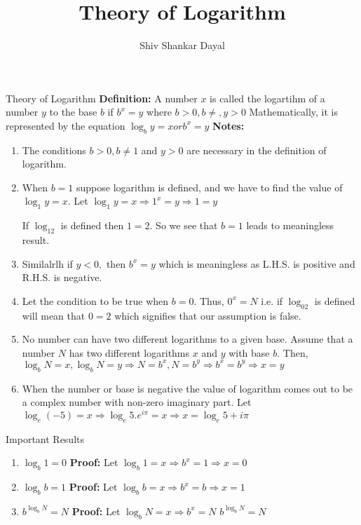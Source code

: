\documentclass[aspectratio=1610,8pt]{beamer}
\title{Theory of Logarithm}
\author[Shiv Shankar Dayal]{Shiv Shankar Dayal}
\begin{document}
\begin{frame}
  \titlepage
\end{frame}
\begin{frame}{Theory of Logarithm}
  \textbf{Definition:} A number $x$ is called the logartihm of a number $y$ to the base $b$ if $b^x = y$ where $b>0, b\neq , y > 0$
  \linebreak\linebreak
  Mathematically, it is represented by the equation $\log_b y = x or b^x = y$
  \linebreak\linebreak
  \textbf{Notes:}
  \begin{enumerate}
  \item The conditions $b>0, b\neq 1$ and $y > 0$ are necessary in the definition of logarithm.
  \item When $b=1$ suppose logarithm is defined, and we have to find the value of $\log_1y = x.$ Let $\log_1y = x\Rightarrow 1^x =
    y \Rightarrow 1 = y$

    If $\log_12$ is defined then $1=2.$ So we see that $b=1$ leads to meaningless result.
  \item Similalrlh if $y<0,$ then $b^x = y$ which is meaningless as L.H.S. is positive and R.H.S. is negative.
    \item Let the condition to be true when $b=0.$ Thus, $0^x = N$ i.e. if $\log_02$ is defined will mean that $0=2$ which
      signifies that our assumption is false.
    \item No number can have two different logarithms to a given base. Assume that a number $N$ has two different logarithms $x$
      and $y$ with base $b.$ Then, $\log_b N = x, \log_bN = y\Rightarrow N = b^x, N = b^y \Rightarrow b^x = b^y \Rightarrow x = y$
      \item When the number or base is negative the value of logarithm comes out to be a complex number with non-zero imaginary
        part. Let $\log_e(-5) = x\Rightarrow \log_e5.e^{i\pi} = x\Rightarrow x = \log_e5 + i\pi$
  \end{enumerate}
\end{frame}
\begin{frame}{Important Results}
  \begin{enumerate}
  \item $\log_b 1 = 0$
    \linebreak\linebreak
    \textbf{Proof:} Let $\log_b 1= x\Rightarrow b^x = 1\Rightarrow x = 0$
  \item $\log_bb = 1$
    \linebreak\linebreak
    \textbf{Proof:} Let $\log_bb = x\Rightarrow b^x = b \Rightarrow x = 1$
  \item $b^{\log_bN} = N$
    \linebreak\linebreak
    \textbf{Proof:} Let $\log_bN = x \Rightarrow b^x = N$
    \linebreak\linebreak
    $b^{\log_bN} = N$
  \end{enumerate}
\end{frame}
\end{document}

